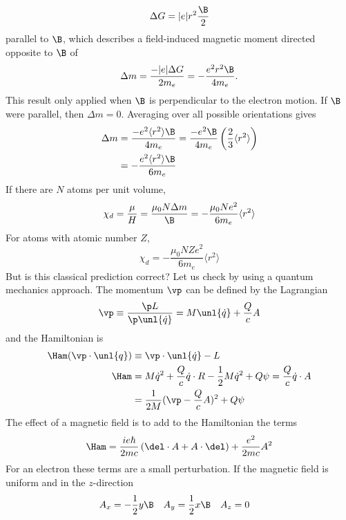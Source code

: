 \documentclass[a4paper, 11pt, normalem]{report}
\begin{document}
\begin{equation}
    \Delta G = |e|r^2\frac{\B}{2}
\end{equation}
parallel to $\B$, which describes a field-induced magnetic moment directed opposite to $\B$ of
\begin{equation}
    \Delta m = \frac{-|e|\Delta G}{2m_e} = -\frac{e^2r^2\B}{4m_e}.
\end{equation}
This result only applied when $\B$ is perpendicular to the electron motion. 
If $\B$ were parallel, then $\Delta m = 0$.
Averaging over all possible orientations gives
\begin{align}
    \Delta m &= \frac{-e^2\langle r^2\rangle\B}{4m_e} = \frac{-e^2\B}{4m_e}\left(\frac23\langle r^2\rangle\right) \\
             &= -\frac{e^2\langle r^2\rangle\B}{6m_e} 
\end{align}
If there are $N$ atoms per unit volume, 
\begin{equation}
    \chi_d = \frac{\mu}{H} = \frac{\mu_0N\Delta m}{\B} = -\frac{\mu_0Ne^2}{6m_e}\langle r^2\rangle
\end{equation}
For atoms with atomic number $Z$,
\begin{equation}
    \chi_d = -\frac{\mu_0NZe^2}{6m_e}\langle r^2\rangle
\end{equation}
But is this classical prediction correct?
Let us check by using a quantum mechanics approach. 
The momentum $\vp$ can be defined by the Lagrangian
\begin{equation}
    \vp \equiv \frac{\p L}{\p \unl{\dot{q}}} = M\unl{\dot{q}} + \frac{Q}{c}A
\end{equation}
and the Hamiltonian is
\begin{align}
    \Ham(\vp\cdot\unl{q}) &\equiv \vp\cdot\unl{\dot{q}} - L \\
    \Ham &= M\dot{q}^2 + \frac{Q}{c}\dot{q}\cdot R - \frac12M\dot{q}^2 + Q\psi = \frac{Q}{c}\dot{q}\cdot A \\
         &= \frac{1}{2M}(\vp - \frac{Q}{c}A)^2 + Q\psi
\end{align}
The effect of a magnetic field is to add to the Hamiltonian the terms
\begin{equation}
    \Ham = \frac{ie\hbar}{2mc}\left(\del\cdot A + A\cdot\del\right) + \frac{e^2}{2mc}A^2
\end{equation}
For an electron these terms are a small perturbation. 
If the magnetic field is uniform and in the $z$-direction
\begin{align}
    A_x &= -\frac12 y\B & A_y &= \frac12 x\B & A_z &= 0 
\end{align}
\end{document}
